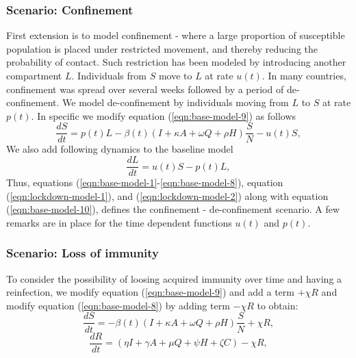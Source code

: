 \documentclass[authoryear,preprint]{elsarticle}
\begin{document}
\subsubsection{Scenario: Confinement}
First extension is to model confinement - where a large proportion of susceptible population is placed under restricted movement, and thereby reducing the probability of contact. Such restriction has been modeled by introducing another compartment $L$. Individuals from $S$ move to $L$ at rate $u(t)$. In many countries, confinement was spread over several weeks followed by a period of de-confinement. We model de-confinement by individuals moving from $L$ to $S$ at rate $p(t)$. In specific we modify equation (\ref{eqn:base-model-9}) as follows
\begin{equation}
\frac{dS}{dt} = p(t)L -\beta(t) \left( I + \kappa A + \omega Q + \rho H \right) \frac{S}{N} - u(t)S,
\label{eqn:lockdown-model-1}
\end{equation}
%
%
We also add following dynamics to the baseline model 
\begin{equation}
\frac{dL}{dt} = u(t)S - p(t)L,
\label{eqn:lockdown-model-2}
\end{equation}
Thus, equations (\ref{eqn:base-model-1}-\ref{eqn:base-model-8}), equation (\ref{eqn:lockdown-model-1}), and (\ref{eqn:lockdown-model-2}) along with equation (\ref{eqn:base-model-10}), defines the confinement - de-confinement scenario. A few remarks are in place for the time dependent functions $u(t)$ and $p(t)$.

\subsubsection{Scenario: Loss of immunity}
To consider the possibility of loosing acquired immunity over time and having a reinfection, we modify  equation (\ref{eqn:base-model-9}) and add a term $+\chi R$ and modify equation (\ref{eqn:base-model-8}) by adding term $-\chi R$ to obtain:
%
%
\begin{equation}
\frac{dS}{dt} = -\beta(t) \left( I + \kappa A + \omega Q + \rho H \right) \frac{S}{N} +\chi R,
\label{eqn:loss_immunity-model-8}
\end{equation}
%
%
\begin{equation}
\frac{dR}{dt} =  \left( \eta I +  \gamma A + \mu Q + \psi H + \zeta C \right) -\chi R,
\label{eqn:loss_immunity-model-9}
\end{equation}
%
\end{document}
